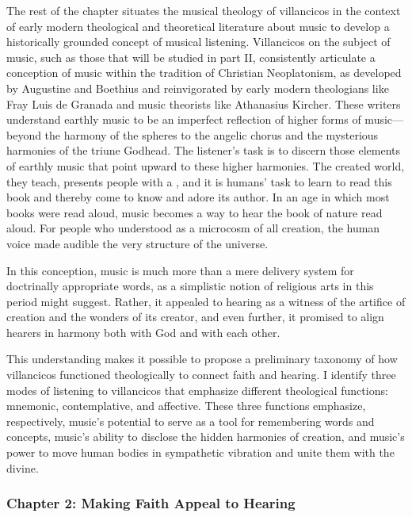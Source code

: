 \documentclass{vcbook-proposal}
\begin{document}
The rest of the chapter situates the musical theology of villancicos in the
context of early modern theological and theoretical literature about music to
develop a historically grounded concept of musical listening.
Villancicos on the subject of music, such as those that will be studied in part
II, consistently articulate a conception of music within the tradition of
Christian Neoplatonism, as developed by Augustine and Boethius and reinvigorated
by early modern theologians like Fray Luis de Granada and music theorists like
Athanasius Kircher.%
    \Autocites{LuisdeGranada:Simbolo}{Kircher:Musurgia}
These writers understand earthly music to be an imperfect reflection of higher 
forms of music---beyond the harmony of the spheres to the angelic chorus and 
the mysterious harmonies of the triune Godhead. 
The listener's task is to discern those elements of earthly music that point 
upward to these higher harmonies.
The created world, they teach, presents people with a , and it is humans' task to learn to read this book and thereby come to 
know and adore its author.
In an age in which most books were read aloud, music becomes a way to hear the
book of nature read aloud.  
For people who understood  as a microcosm of all creation, the 
human voice made audible the very structure of the universe.

In this conception, music is much more than a mere delivery system for 
doctrinally appropriate words, as a simplistic notion of religious arts in this 
period might suggest.
Rather, it appealed to hearing as a witness of the artifice of creation and 
the wonders of its creator, and even further, it promised to align hearers in 
harmony both with God and with each other.

This understanding makes it possible to propose a preliminary taxonomy of how 
villancicos functioned theologically to connect faith and hearing. 
I identify three modes of listening to villancicos that emphasize different 
theological functions: mnemonic, contemplative, and affective.
These three functions emphasize, respectively, music's potential to serve as a
tool for remembering words and concepts, music's ability to disclose the hidden
harmonies of creation, and music's power to move human bodies in sympathetic
vibration and unite them with the divine.

\subsubsection{Chapter 2: Making Faith Appeal to Hearing}
\end{document}
